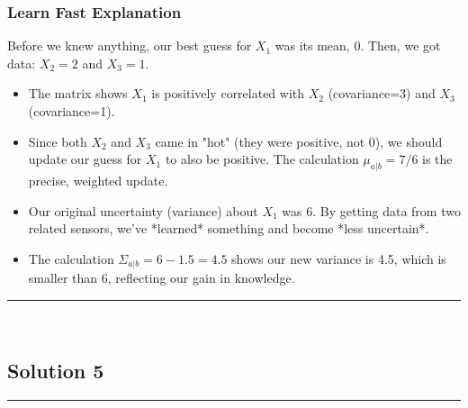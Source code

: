 \documentclass{article}
\begin{document}
\subsubsection*{Learn Fast Explanation}
Before we knew anything, our best guess for $X_1$ was its mean, 0.
Then, we got data: $X_2=2$ and $X_3=1$.
\begin{itemize}
    \item The matrix shows $X_1$ is positively correlated with $X_2$ (covariance=3) and $X_3$ (covariance=1).
    \item Since both $X_2$ and $X_3$ came in "hot" (they were positive, not 0), we should update our guess for $X_1$ to also be positive. The calculation $\mu_{a|b} = 7/6$ is the precise, weighted update.
    \item Our original uncertainty (variance) about $X_1$ was 6. By getting data from two related sensors, we've *learned* something and become *less uncertain*.
    \item The calculation $\Sigma_{a|b} = 6 - 1.5 = 4.5$ shows our new variance is 4.5, which is smaller than 6, reflecting our gain in knowledge.
\end{itemize}


\noindent\rule{\textwidth}{0.4pt}\\

\newpage
\subsection*{Solution 5}
\noindent\rule{\textwidth}{0.4pt}\\
\end{document}

